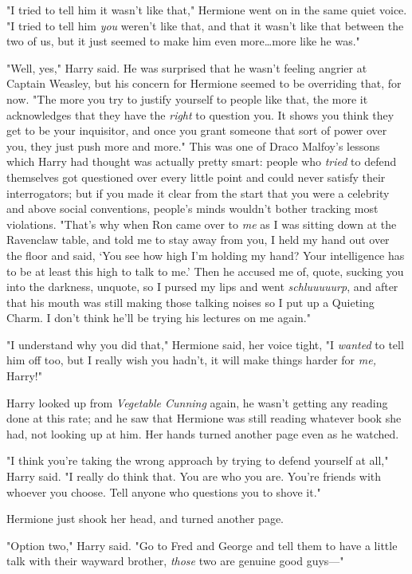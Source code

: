 "I tried to tell him it wasn’t like that," Hermione went on in the same quiet
voice. "I tried to tell him \emph{you} weren’t like that, and that it wasn’t
like that between the two of us, but it just seemed to make him even
more…more like he was."

"Well, yes," Harry said. He was surprised that he wasn’t feeling angrier at
Captain Weasley, but his concern for Hermione seemed to be overriding that, for
now. "The more you try to justify yourself to people like that, the more it
acknowledges that they have the \emph{right} to question you. It shows you
think they get to be your inquisitor, and once you grant someone that sort of
power over you, they just push more and more." This was one of Draco Malfoy’s
lessons which Harry had thought was actually pretty smart: people who
\emph{tried} to defend themselves got questioned over every little point and
could never satisfy their interrogators; but if you made it clear from the
start that you were a celebrity and above social conventions, people’s minds
wouldn’t bother tracking most violations. "That’s why when Ron came over to
\emph{me} as I was sitting down at the Ravenclaw table, and told me to stay
away from you, I held my hand out over the floor and said, ‘You see how high
I’m holding my hand? Your intelligence has to be at least this high to talk to
me.’ Then he accused me of, quote, sucking you into the darkness, unquote, so I
pursed my lips and went \emph{schluuuuurp}, and after that his mouth was still
making those talking noises so I put up a Quieting Charm. I don’t think he’ll
be trying his lectures on me again."

"I understand why you did that," Hermione said, her voice tight, "I
\emph{wanted} to tell him off too, but I really wish you hadn’t, it will make
things harder for \emph{me,} Harry!"

Harry looked up from \emph{Vegetable Cunning} again, he wasn’t getting any
reading done at this rate; and he saw that Hermione was still reading whatever
book she had, not looking up at him. Her hands turned another page even as he
watched.

"I think you’re taking the wrong approach by trying to defend yourself at all,"
Harry said. "I really do think that. You are who you are. You’re friends with
whoever you choose. Tell anyone who questions you to shove it."

Hermione just shook her head, and turned another page.

"Option two," Harry said. "Go to Fred and George and tell them to have a little
talk with their wayward brother, \emph{those} two are genuine good guys—"

